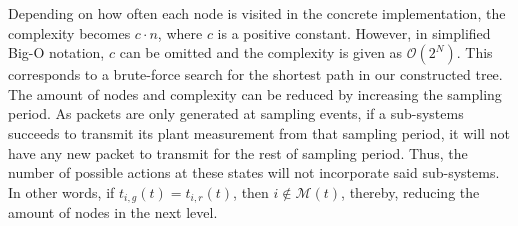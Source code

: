 Depending on how often each node is visited in the concrete implementation, the
complexity becomes $c \cdot n$, where $c$ is a positive constant. However, in
simplified Big-O notation, $c$ can be omitted and the complexity is given as
$\mathcal{O}(2^N)$. This corresponds to a brute-force search for the shortest
path in our constructed tree. The amount of nodes and complexity can be reduced
by increasing the sampling period. As packets are only generated at sampling
events, if a sub-systems succeeds to transmit its plant measurement from that
sampling period, it will not have any new packet to transmit for the rest of
sampling period. Thus, the number of possible actions at these states will not
incorporate said sub-systems. In other words, if $t_{i,g}(t) = t_{i,r}(t)$, then
$i \not \in \mathcal{M}(t)$, thereby, reducing the amount of nodes in the next
level.
